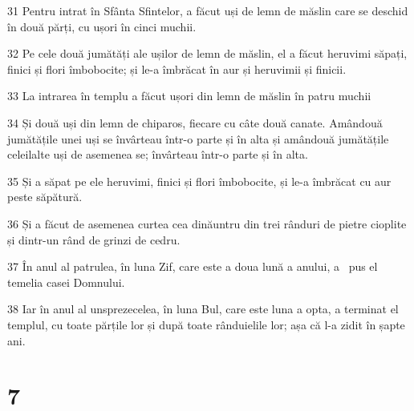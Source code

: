 \par 31 Pentru intrat în Sfânta Sfintelor, a făcut uși de lemn de măslin care se deschid în două părți, cu ușori în cinci muchii.
\par 32 Pe cele două jumătăți ale ușilor de lemn de măslin, el a făcut heruvimi săpați, finici și flori îmbobocite; și le-a îmbrăcat în aur și heruvimii și finicii.
\par 33 La intrarea în templu a făcut ușori din lemn de măslin în patru muchii
\par 34 Și două uși din lemn de chiparos, fiecare cu câte două canate. Amândouă jumătățile unei uși se învârteau într-o parte și în alta și amândouă jumătățile celeilalte uși de asemenea se; învârteau într-o parte și în alta.
\par 35 Și a săpat pe ele heruvimi, finici și flori îmbobocite, și le-a îmbrăcat cu aur peste săpătură.
\par 36 Și a făcut de asemenea curtea cea dinăuntru din trei rânduri de pietre cioplite și dintr-un rând de grinzi de cedru.
\par 37 În anul al patrulea, în luna Zif, care este a doua lună a anului, a  pus el temelia casei Domnului.
\par 38 Iar în anul al unsprezecelea, în luna Bul, care este luna a opta, a terminat el templul, cu toate părțile lor și după toate rânduielile lor; așa că l-a zidit în șapte ani.

\chapter{7}

